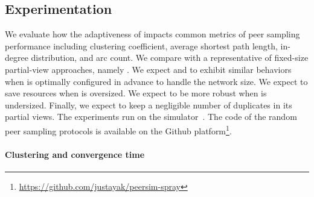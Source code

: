\subsection{Experimentation}
\label{subsec:experiments}

We evaluate how the adaptiveness of \SPRAY impacts common metrics of
peer sampling performance including clustering coefficient, average
shortest path length, in-degree distribution, and arc count. We
compare \SPRAY with a representative of fixed-size partial-view
approaches, namely \CYCLON. We expect \SPRAY and \CYCLON to exhibit 
similar behaviors when \CYCLON is optimally configured in advance to
handle the network size. We expect \SPRAY to save resources when
\CYCLON is oversized. We expect \SPRAY to be more robust when \CYCLON
is undersized. Finally, we expect \SPRAY to keep a negligible number
of duplicates in its partial views. The experiments run on the
\PEERSIM simulator~\cite{montresor2009peersim}. The code of the random
peer sampling protocols is available on the Github
platform\footnote{\url{https://github.com/justayak/peersim-spray}}.









\paragraph{Clustering and convergence time}

